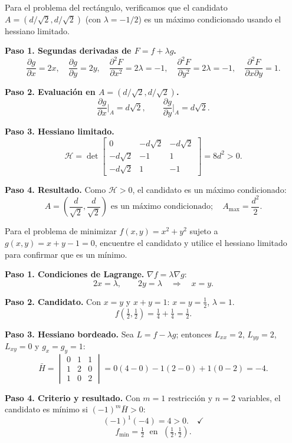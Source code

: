 \begin{example}
Para el problema del rectángulo, verificamos que el candidato $A=(d/\sqrt2,d/\sqrt2)$ (con $\lambda=-1/2$) es un máximo condicionado usando el hessiano limitado.
\begin{myproof}
\textbf{Paso 1. Segundas derivadas de $F=f+\lambda g$.}
\[
\frac{\partial g}{\partial x}=2x,\quad \frac{\partial g}{\partial y}=2y,\quad
\frac{\partial^2 F}{\partial x^2}=2\lambda=-1,\quad
\frac{\partial^2 F}{\partial y^2}=2\lambda=-1,\quad
\frac{\partial^2 F}{\partial x\partial y}=1.
\]

\textbf{Paso 2. Evaluación en $A=(d/\sqrt2,d/\sqrt2)$.}
\[
\frac{\partial g}{\partial x}\bigg|_A=d\sqrt{2},\qquad \frac{\partial g}{\partial y}\bigg|_A=d\sqrt{2}.
\]

\textbf{Paso 3. Hessiano limitado.}
\[
\mathcal{H}=\det\begin{bmatrix}
0 & -d\sqrt2 & -d\sqrt2 \\
-d\sqrt2 & -1 & 1 \\
-d\sqrt2 & 1 & -1
\end{bmatrix}
= 8d^2 > 0.
\]

\textbf{Paso 4. Resultado.}
Como $\mathcal{H}>0$, el candidato es un máximo condicionado:
\[
\boxed{A=\left(\frac{d}{\sqrt2},\frac{d}{\sqrt2}\right) \text{ es un máximo condicionado};\quad A_{\max}=\frac{d^2}{2}}.
\]
\end{myproof}
\end{example}

\begin{prob}
Para el problema de minimizar $f(x,y)=x^2+y^2$ sujeto a $g(x,y)=x+y-1=0$, encuentre el candidato y utilice el hessiano limitado para confirmar que es un mínimo.
\begin{myproof}
\textbf{Paso 1. Condiciones de Lagrange.} $\nabla f=\lambda\nabla g$:
\[
2x=\lambda,\qquad 2y=\lambda \quad\Rightarrow\quad x=y.
\]

\textbf{Paso 2. Candidato.} Con $x=y$ y $x+y=1$: $x=y=\frac{1}{2}$, $\lambda=1$.
\[
f\!\left(\tfrac{1}{2},\tfrac{1}{2}\right)=\tfrac{1}{4}+\tfrac{1}{4}=\tfrac{1}{2}.
\]

\textbf{Paso 3. Hessiano bordeado.} Sea $L=f-\lambda g$; entonces
$L_{xx}=2$, $L_{yy}=2$, $L_{xy}=0$ y $g_x=g_y=1$:
\[
\bar{H}=
\begin{vmatrix}
0 & 1 & 1\\
1 & 2 & 0\\
1 & 0 & 2
\end{vmatrix}
=0(4-0)-1(2-0)+1(0-2)=-4.
\]

\textbf{Paso 4. Criterio y resultado.} Con $m=1$ restricción y $n=2$ variables,
el candidato es mínimo si $(-1)^{m}\bar{H}>0$:
\[
(-1)^{1}(-4)=4>0.\quad\checkmark
\]
\[
\boxed{f_{\min}=\tfrac{1}{2}\;\text{ en }\;\left(\tfrac{1}{2},\tfrac{1}{2}\right).}
\]
\end{myproof}
\end{prob}

